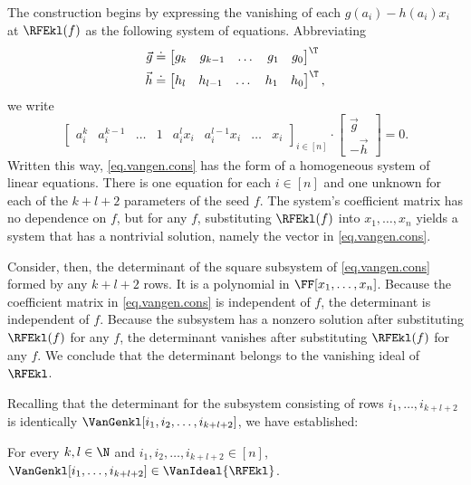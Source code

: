 \documentclass{toc}
\begin{document}
The construction begins by expressing the vanishing of each
\(g(a_i) - h(a_i)x_i\) at \(\RFEkl(f)\)
as the following system of equations.
Abbreviating
\begin{align*}
  \vec{g} &\doteq
  \begin{bmatrix}
    g_k & g_{k-1} & \dots & g_1 & g_0
  \end{bmatrix}^\T
  \\
  \vec{h} &\doteq
  \begin{bmatrix}
    h_l & h_{l-1} & \dots & h_1 & h_0
  \end{bmatrix}^\T,
\end{align*}
we write
\begin{equation}\label{eq.vangen.cons}
  \begin{bmatrix}
    a_i^k     & a_i^{k-1}    & \dots & 1 &
    a_i^l x_i & a_i^{l-1}x_i & \dots & x_i
  \end{bmatrix}_{i \in [n]}
  \cdot
  \begin{bmatrix}
    \vec{g} \\
    -\vec{h}
  \end{bmatrix}
  = 0.
\end{equation}
Written this way, \eqref{eq.vangen.cons} has the form of a homogeneous system
of linear equations.
There is one equation for each \(i \in [n]\)
and one unknown for each of the \(k+l+2\) parameters of the seed \(f\).
The system's coefficient matrix has no dependence on \(f\), but 
for any \(f\), substituting \(\RFEkl(f)\) into \(x_1, \ldots, x_n\)
yields a system that has a nontrivial solution,
namely the vector in \eqref{eq.vangen.cons}.

Consider, then,
the determinant of the square subsystem of \eqref{eq.vangen.cons} formed by
any \(k+l+2\) rows.
It is a polynomial in \(\FF[x_1, \ldots, x_n]\).
Because the coefficient matrix in \eqref{eq.vangen.cons} is independent of
\(f\),
the determinant is independent of \(f\).
Because the subsystem has a nonzero solution after substituting \(\RFEkl(f)\)
for any \(f\),
the determinant vanishes after substituting \(\RFEkl(f)\) for any \(f\).
We conclude that the determinant belongs to the vanishing ideal of \(\RFEkl\).

Recalling that the determinant for the subsystem consisting of rows
\(i_1,\ldots,i_{k+l+2}\) is identically
$\VanGenkl[i_1,i_2, \dots, i_{k+l+2}]$,
we have established:
\begin{lemma}
  \label{lemma.vangen-vanishes}
  For every \(k,l \in \N\) and $i_1,i_2,\dots,i_{k+l+2} \in [n]$,
  \(\VanGenkl[i_1, \ldots, i_{k+l+2}] \in \VanIdeal{\RFEkl}\).
\end{lemma}
\end{document}
